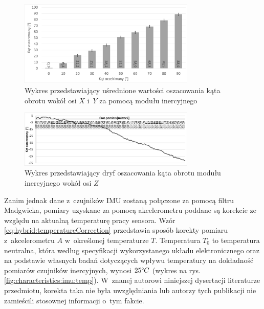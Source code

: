 \begin{savenotes}
	\begin{figure}[h]
																			
		\centering 
		\includegraphics[width=0.75\textwidth]{images/imumeasuredAngles.png}
		\caption{Wykres przedstawiający uśrednione wartości oszacowania kąta obrotu wokół osi $X$ i~$Y$ za pomocą modułu inercyjnego}
		\label{fig:hybrid:imu:XYRot}
	\end{figure}
\end{savenotes}
\begin{savenotes}
	\begin{figure}[h]
		\centering 
		\includegraphics[width=0.75\textwidth]{images/imuDrift.png}
		\caption{Wykres przedstawiający dryf oszacowania kąta obrotu modułu inercyjnego wokół osi $Z$}
		\label{fig:hybrid:imu:drift}
																				
	\end{figure}
\end{savenotes}
						
Zanim jednak dane z~czujników IMU zostaną połączone za pomocą filtru Madgwicka, pomiary uzyskane za pomocą akcelerometru poddane są korekcie ze względu na aktualną temperaturę pracy sensora. Wzór \ref{eq:hybrid:temperatureCorrection} przedstawia sposób korekty pomiaru z~akcelerometru  $A$ w~określonej temperaturze $T$. Temperatura $T_0$ to temperatura neutralna, która według specyfikacji wykorzystanego układu elektronicznego oraz na podstawie własnych badań dotyczących wpływu temperatury na dokładność pomiarów czujników inercyjnych, wynosi $25\degree C$ (wykres na rys. \ref{fig:characteristics:imu:temp}). W~znanej autorowi niniejszej dysertacji literaturze przedmiotu, korekta taka nie była uwzględniania lub autorzy tych publikacji nie zamieścili stosownej informacji o~tym fakcie.
						
